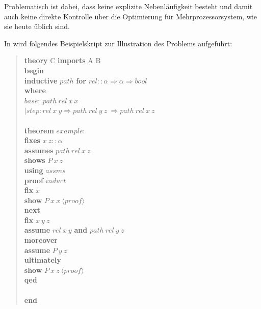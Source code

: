 Problematisch ist dabei, dass keine explizite Nebenläufigkeit besteht und damit auch keine direkte
Kontrolle über die Optimierung für Mehrprozessorsystem, wie sie heute üblich sind.

\clearpage

In \cite[S. 2]{parproof} wird folgendes Beispielskript zur Illustration des Problems aufgeführt:

\begin{quote}
\textbf{theory} C \textbf{imports} A B\\
\textbf{begin}\\
\textbf{inductive} $path$ \textbf{for} $rel :: \alpha \Rightarrow \alpha \Rightarrow bool$\\
\textbf{where}\\
\hspace*{7 mm}$base:\ path\ rel\ x\ x$\\
$|$\hspace*{6 mm}$step: rel\ x\ y \Longrightarrow path\ rel\ y\ z\ \Longrightarrow path\ rel\ x\ z$\\
\\
\textbf{theorem} $example:$\\
\hspace*{7 mm}\textbf{ﬁxes} $x\ z :: \alpha$\\
\hspace*{7 mm}\textbf{assumes} $path\ rel\ x\ z$\\
\hspace*{7 mm}\textbf{shows} $P\ x\ z$\\
\textbf{using} $assms$\\
\textbf{proof} $induct$\\
\hspace*{7 mm}\textbf{ﬁx} $x$\\
\hspace*{7 mm}\textbf{show} $P\ x\ x\ \langle proof\rangle$\\
\textbf{next}\\
\hspace*{7 mm}\textbf{ﬁx} $x\ y\ z$\\
\hspace*{7 mm}\textbf{assume} $rel\ x\ y$ \textbf{and} $path\ rel\ y\ z$\\
\hspace*{7 mm}\textbf{moreover}\\
\hspace*{7 mm}\textbf{assume} $P\ y\ z$\\
\hspace*{7 mm}\textbf{ultimately}\\
\hspace*{7 mm}\textbf{show} $P\ x\ z\ \langle proof\rangle$\\
\textbf{qed}\\
\\
\textbf{end}
\end{quote}

